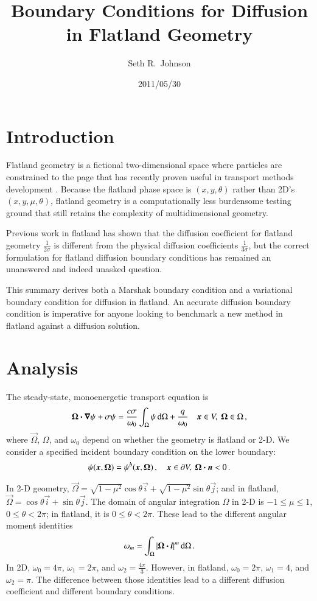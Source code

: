 \documentclass{anstrans}
\title{Boundary Conditions for Diffusion in Flatland Geometry}
\author{Seth R.~Johnson}
\institute{Department of Nuclear Engineering \& Radiological Sciences, University of Michigan, Ann Arbor, MI, 48109}
\date{2011/05/30}
\begin{document}
\section{Introduction}
Flatland geometry is a fictional two-dimensional space where particles are
constrained to the page \cite{Asa2008} that has recently proven useful in
transport methods development \cite{Lar2009c}. Because the flatland phase
space is $(x,y,\theta)$ rather than 2D's $(x,y,\mu,\theta)$, flatland geometry
is a computationally less burdensome testing ground that still retains the
complexity of multidimensional geometry.

Previous work in flatland has shown that the diffusion
coefficient for flatland geometry $\frac{1}{2\sigma}$ is different from
the physical diffusion coefficients $\frac{1}{3\sigma}$, but the correct
formulation for flatland diffusion boundary conditions has remained an
unanswered and indeed unasked question.

This summary derives both a Marshak boundary condition and a variational
boundary condition for diffusion in flatland. An accurate diffusion boundary
condition is imperative for anyone looking to benchmark a new method in
flatland against a diffusion solution.

\section{Analysis}
The steady-state, monoenergetic transport equation is
\begin{equation}\label{eq:generalTransport}
  \bm{\Omega}\bm{\cdot} \bm{\nabla} \psi + \sigma \psi
  = \frac{c \sigma}{\omega_0} \int_{\Omega} \psi \mathop{}\!\mathrm{d}\Omega + \frac{q}{\omega_0}
  \quad \bm{x}\in V,\ \bm{\Omega}\in \Omega \,,
\end{equation}
where $\vec{\Omega}$, $\Omega$, and $\omega_0$ depend on whether the geometry
is flatland or 2-D. We consider a specified incident boundary condition on the
lower boundary:
\begin{equation} \label{eq:ssBndy}
  \psi(\bm{x}, \bm{\Omega}) = \psi^b(\bm{x}, \bm{\Omega})\,,
  \quad \bm{x}\in \partial V,\ \bm{\Omega} \bm{\cdot} \bm{n} < 0\,.
\end{equation}

In 2-D geometry, $\vec{\Omega}=\sqrt{1-\mu^2} \cos \theta \vec{i} +
\sqrt{1-\mu^2} \sin \theta \vec{j}$; and in flatland, $\vec{\Omega}=\cos \theta
\vec{i} + \sin \theta \vec{j}$. The domain of angular integration $\Omega$ in
2-D is $-1\le\mu\le1$, $0 \le \theta < 2\pi$; in flatland, it is $0 \le \theta
< 2\pi$. These lead to the different angular moment identities
\begin{equation}\label{eq:omegaIdentities}
  \omega_m = \int_{\Omega} \left| \bm{\Omega}\bm{\cdot} \bm{i} \right|^m \mathop{}\!\mathrm{d}\Omega\,.
\end{equation}
In 2D, $\omega_0=4\pi$, $\omega_1=2\pi$, and $\omega_2=\frac{4\pi}{3}$.
However, in flatland, $\omega_0=2\pi$, $\omega_1=4$, and $\omega_2=\pi$. The
difference between those identities lead to a different diffusion coefficient
and different boundary conditions.
\end{document}
